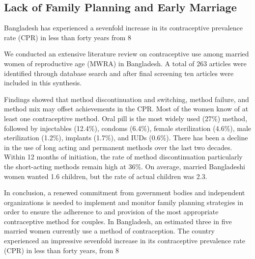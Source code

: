 \documentclass[a4paper,12pt]{article}
\begin{document}
\subsection{Lack of Family Planning and Early Marriage}
Bangladesh has experienced a sevenfold increase in its contraceptive prevalence rate (CPR) in less than forty years from 8%

We conducted an extensive literature review on contraceptive use among married women of reproductive age (MWRA) in Bangladesh. A total of 263 articles were identified through database search and after final screening ten articles were included in this synthesis.

Findings showed that method discontinuation and switching, method failure, and method mix may offset achievements in the CPR. Most of the women know of at least one contraceptive method. Oral pill is the most widely used (27\%) method, followed by injectables (12.4\%), condoms (6.4\%), female sterilization (4.6\%), male sterilization (1.2\%), implants (1.7\%), and IUDs (0.6\%). There has been a decline in the use of long acting and permanent methods over the last two decades. Within 12 months of initiation, the rate of method discontinuation particularly the short-acting methods remain high at 36\%. On average, married Bangladeshi women wanted 1.6 children, but the rate of actual children was 2.3.

In conclusion, a renewed commitment from government bodies and independent organizations is needed to implement and monitor family planning strategies in order to ensure the adherence to and provision of the most appropriate contraceptive method for couples.
In Bangladesh, an estimated three in five married women currently use a method of contraception. The country experienced an impressive sevenfold increase in its contraceptive prevalence rate (CPR) in less than forty years, from 8%
\end{document}
